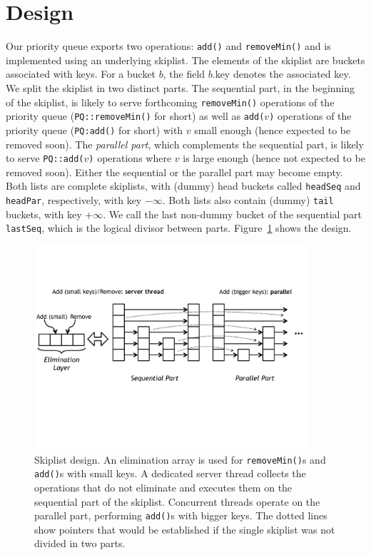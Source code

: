 \section{Design}
\label{Sec-Design}

Our priority queue exports two operations: \texttt{add()} and \texttt{removeMin()} and is implemented using an underlying skiplist. The elements of the skiplist are buckets associated with keys. For a bucket $b$, the field $b$.key denotes the associated key.
We split the skiplist in two distinct parts. The sequential part, in the beginning of the skiplist, is likely to serve forthcoming \texttt{removeMin()} operations of the priority queue (\texttt{PQ::removeMin()} for short) as well as \texttt{add($v$)} operations of the priority queue (\texttt{PQ:add()} for short) with $v$ small enough (hence expected to be removed soon). The \emph{parallel part}, which complements the sequential part, is likely to serve \texttt{PQ::add($v$)} operations where $v$ is large enough (hence not expected to be removed soon). Either the sequential or the parallel part may become empty.
Both lists are complete skiplists, with (dummy) head buckets called \texttt{headSeq} and \texttt{headPar}, respectively, with key $- \infty$. Both lists also contain (dummy) \texttt{tail} buckets, with key $+ \infty$. We call the last non-dummy bucket of the sequential part \texttt{lastSeq}, which is the logical divisor between parts. Figure~\ref{fig:pqe} shows the design.

\begin{figure}[htb]
\centering
  \includegraphics[width=0.9\textwidth]{img/pqe.pdf}
\caption{Skiplist design. An elimination array is used for \texttt{removeMin()}s and \texttt{add()}s with small keys. A dedicated server thread collects the operations that do not eliminate and executes them on the sequential part of the skiplist. Concurrent threads operate on the parallel part, performing \texttt{add()}s with bigger keys. The dotted lines show pointers that would be established if the single skiplist was not divided in two parts.}
\label{fig:pqe}
\end{figure}

